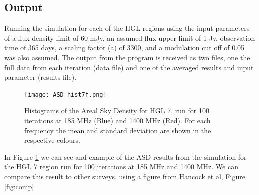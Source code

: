 \documentclass[a4paper]{article}
\begin{document}
\subsection{Output}
Running the simulation for each of the HGL regions using the input parameters of a flux density limit of 60 mJy, an assumed flux upper limit of 1 Jy, observation time of 365 days, a scaling factor (a) of 3300, and a modulation cut off of 0.05 was also assumed. The output from the program is received as two files, one the full data from each iteration (data file) and one of the averaged results and input parameter (results file). 
\begin{figure}[H]
\begin{center}
  \texttt{[image: ASD\_hist7f.png]}
  \caption{Histograms of the Areal Sky Density for HGL 7, run for 100 iterations at 185 MHz (Blue) and 1400 MHz (Red). For each frequency the mean and standard deviation are shown in the respective colours.}
  \label{fig:ADS1}
\end{center}
\end{figure}
In Figure \ref{fig:ADS1} we can see and example of the ASD results from the simulation for the HGL 7 region run for 100 iterations at 185 MHz and 1400 MHz. We can compare this result to other surveys, using a figure from Hancock et al, Figure \ref{fig:comp}
\end{document}
